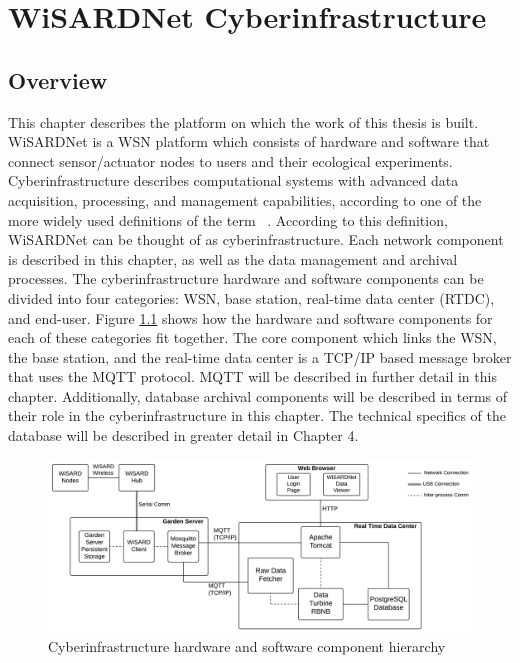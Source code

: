 
\chapter{WiSARDNet Cyberinfrastructure} %
\label{Chapter 3}
\lhead{} %

\section{Overview}
This chapter describes the platform on which the work of this thesis is built. WiSARDNet is a WSN platform which consists of hardware and software that connect sensor/actuator nodes to users and their ecological experiments. Cyberinfrastructure describes computational systems with advanced data acquisition, processing, and management capabilities, according to one of the more widely used definitions of the term ~\cite{stewart10}. According to this definition, WiSARDNet can be thought of as cyberinfrastructure. Each network component is described in this chapter, as well as the data management and archival processes. The cyberinfrastructure hardware and software components can be divided into four categories: WSN, base station, real-time data center (RTDC), and end-user. Figure \ref{fig:device_hierarchy} shows how the hardware and software components for each of these categories fit together. The core component which links the WSN, the base station, and the real-time data center is a TCP/IP based message broker that uses the MQTT protocol. MQTT will be described in further detail in this chapter. Additionally, database archival components will be described in terms of their role in the cyberinfrastructure in this chapter. The technical specifics of the database will be described in greater detail in Chapter 4.\\

\begin{figure}[H]
	\centering
	\includegraphics[width=\textwidth]{figures/wisardnet_ci_final}
	\caption{Cyberinfrastructure hardware and software component hierarchy}
	\label{fig:device_hierarchy}
\end{figure}

